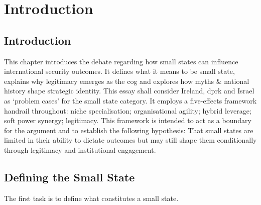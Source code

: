 \chapter{Introduction}


\section{Introduction}This chapter introduces the debate regarding how small states can influence international security outcomes. It defines what it means to be small state, explains why legitimacy emerges as the \gls{cog} and explores how myths \& national history shape strategic identity. This essay shall consider Ireland, \gls{dprk} and Israel as `problem cases' for the small state category. It employs a five-effects framework handrail throughout: niche specialisation; organisational agility; hybrid leverage; soft power synergy; legitimacy. This framework is intended to act as a boundary for the argument and to establish the following hypothesis: That small states are limited in their ability to dictate outcomes but may still shape them conditionally through legitimacy and institutional engagement.

\section{Defining the Small State} The first task is to define what constitutes a small state.\parencite{KEOHANE_1969,BROOKS_2007,BIDDLE_1996}
 